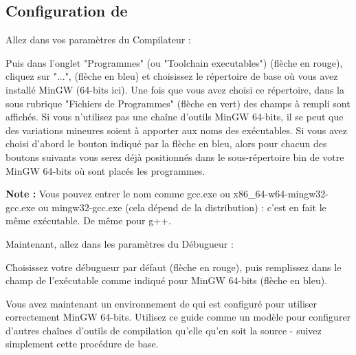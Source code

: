\newpage
\subsection{Configuration de \codeblocks}

Allez dans vos paramètres du Compilateur :


Puis dans l'onglet "Programmes" (ou "Toolchain executables") (flèche en rouge), cliquez sur "...", (flèche en bleu) et choisissez le répertoire de base où vous avez installé MinGW (64-bits ici). Une fois que vous avez choisi ce répertoire, dans la sous rubrique "Fichiers de Programmes" (flèche en vert) des champs à rempli sont affichés. Si vous n'utilisez pas une chaîne d'outils MinGW 64-bits, il se peut que des variations mineures soient à apporter aux noms des exécutables. Si vous avez choisi d'abord le bouton indiqué par la flèche en bleu, alors pour chacun des boutons suivants vous serez déjà positionnés dans le sous-répertoire bin de votre MinGW 64-bits où sont placés les programmes.


\textbf{Note :} Vous pouvez entrer le nom comme gcc.exe ou x86\_64-w64-mingw32-gcc.exe ou mingw32-gcc.exe (cela dépend de la distribution) : c'est en fait le même exécutable. De même pour g++.



Maintenant, allez dans les paramètres du Débugueur :


Choisissez votre débugueur par défaut (flèche en rouge), puis remplissez dans le champ de l'exécutable comme indiqué pour MinGW 64-bits (flèche en bleu).



Vous avez maintenant un environnement de \codeblocks qui est configuré pour utiliser correctement MinGW 64-bits. Utilisez ce guide comme un modèle pour configurer d'autres chaînes d'outils de compilation qu'elle qu'en soit la source - suivez simplement cette procédure de base.

